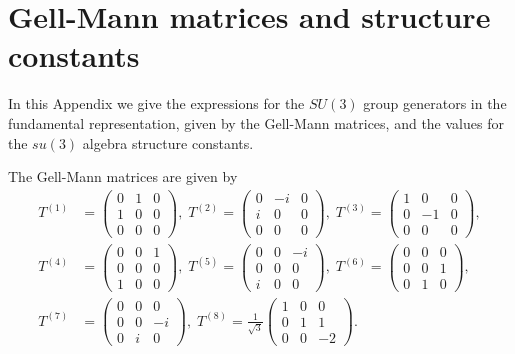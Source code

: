 
\chapter{Gell-Mann matrices and structure constants}
\label{apex_SU3}

In this Appendix we give the expressions for the $SU(3)$ group generators in the fundamental representation, given by the Gell-Mann matrices, and the values for the $su(3)$ algebra structure constants.


The Gell-Mann matrices are given by
\begin{align}
T^{(1)}&=\begin{pmatrix}
0 & 1 & 0 \\ 
1 & 0 & 0 \\ 
0 & 0 & 0
\end{pmatrix},\;
T^{(2)}=\begin{pmatrix}
0 & -i & 0 \\ 
i & 0 & 0 \\ 
0 & 0 & 0
\end{pmatrix},\;
T^{(3)}=\begin{pmatrix}
1 & 0 & 0 \\ 
0 & -1 & 0 \\ 
0 & 0 & 0
\end{pmatrix}, \nonumber \\
T^{(4)}&=\begin{pmatrix}
0 & 0 & 1 \\ 
0 & 0 & 0 \\ 
1 & 0 & 0
\end{pmatrix},\;
T^{(5)}=\begin{pmatrix}
0 & 0 & -i \\ 
0 & 0 & 0 \\ 
i & 0 & 0
\end{pmatrix},\;
T^{(6)}=\begin{pmatrix}
0 & 0 & 0 \\ 
0 & 0 & 1 \\ 
0 & 1 & 0
\end{pmatrix}, \nonumber \\
T^{(7)}&=\begin{pmatrix}
0 & 0 & 0 \\ 
0 & 0 & -i \\ 
0 & i & 0
\end{pmatrix},\;
T^{(8)}=\frac{1}{\sqrt{3}}\begin{pmatrix}
1 & 0 & 0 \\ 
0 & 1 & 1 \\ 
0 & 0 & -2
\end{pmatrix}.
\end{align}

